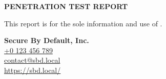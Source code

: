 


\pagestyle{fancy}
\fancyhf{} %

\begin{titlepage}

  \vspace*{\fill}

  \begin{center}
  \end{center}

  \vfill
  
  {
    \Huge \textbf{\MakeUppercase{Penetration Test Report}}
    \vspace{1ex}
  }

  {
    \Large \textbf{}
  }

  {
    \Large \textbf{}
  }

\end{titlepage}


\fancyfoot[C]{\thepage}

{
  \vspace*{\fill}

  This report is for the sole information and use of .

  \textbf{Secure By Default, Inc.} \\
  \href{tel:+0123456789}{+0 123 456 789} \\
  \href{mailto:contact@sbd.local}{contact@sbd.local} \\
  \href{https://sbd.local/}{https://sbd.local/}
}

